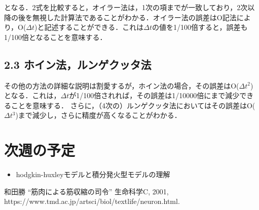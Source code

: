 \documentclass[dvipdfmx, A4j, twocolumn, 10.5pt]{jsarticle}
\begin{document}
となる．2式を比較すると，オイラー法は，1次の項までが一致しており，2次以降の後を無視した計算法であることがわかる．オイラー法の誤差はO記法により，O($\Delta t$)と記述することができる．これは$\Delta t$の値を1/100倍すると，誤差も1/100倍となることを意味する．

\subsection*{2.3 ホイン法，ルンゲクッタ法}
その他の方法の詳細な説明は割愛するが，ホイン法の場合，その誤差はO($\Delta t^2$)となる．これは，$\Delta t$が1/100倍されれば，その誤差は1/10000倍にまで減少できることを意味する．
さらに，（4次の）ルンゲクッタ法においてはその誤差はO($\Delta t^3$)まで減少し，さらに精度が高くなることがわかる．

\section*{次週の予定}

\begin{itemize}
 \item hodgkin-huxleyモデルと積分発火型モデルの理解

\end{itemize}


\begin{thebibliography}{99}
 和田勝 ``筋肉による筋収縮の司令'' 生命科学C, 2001, https://www.tmd.ac.jp/artsci/biol/textlife/neuron.html.
\end{thebibliography}
\end{document}
